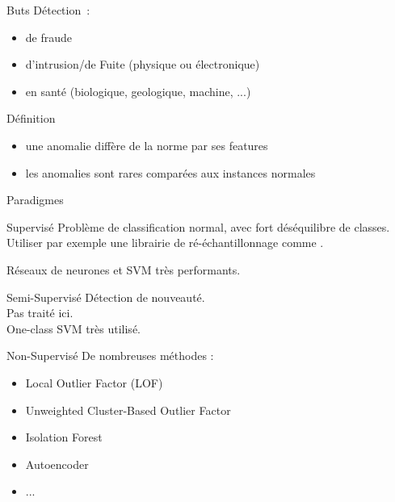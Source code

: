 \begin{frame}{Buts}
  Détection~:
  \begin{itemize}
  \item de fraude
  \item d'intrusion/de Fuite (physique ou électronique)
  \item en santé (biologique, geologique, machine, ...)
  \end{itemize}
\end{frame}

\begin{frame}{Définition}
  \begin{itemize}
  \item une anomalie diffère de la norme par ses features
  \item les anomalies sont rares comparées aux instances normales
  \end{itemize}
\end{frame}

\begin{frame}{Paradigmes}
\end{frame}

\begin{frame}{Supervisé}
  Problème de classification normal, avec fort déséquilibre de classes.
  Utiliser par exemple une librairie de ré-échantillonnage comme .

  Réseaux de neurones et SVM très performants.
\end{frame}

\begin{frame}{Semi-Supervisé}
  Détection de nouveauté. \\
  Pas traité ici. \\
  One-class SVM très utilisé.
\end{frame}

\begin{frame}{Non-Supervisé}
  De nombreuses méthodes : 
  \begin{itemize}
  \item Local Outlier Factor (LOF)
  \item Unweighted Cluster-Based Outlier Factor
  \item Isolation Forest
  \item Autoencoder
  \item ...
  \end{itemize}
\end{frame}


